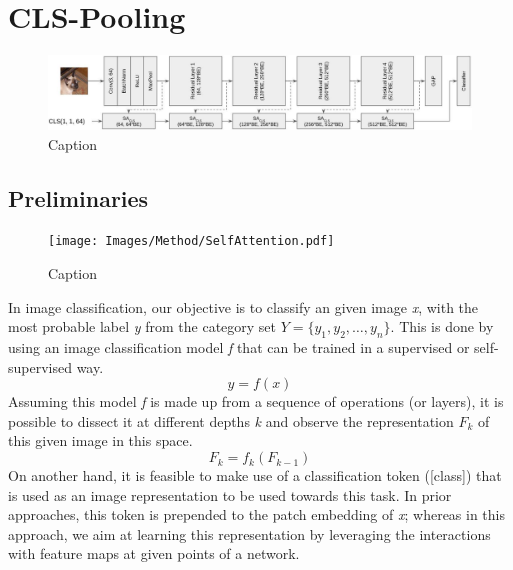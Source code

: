 \section{CLS-Pooling}
\begin{figure}[t]
    \centering
    \includegraphics[scale=0.3]{Images/Method/Stream.pdf}
    \caption{Caption}
    \label{fig:fig_method}
\end{figure}

\subsection{Preliminaries}
\begin{figure}[t]
    \centering
    \texttt{[image: Images/Method/SelfAttention.pdf]}
    \caption{Caption}
    \label{fig:fig_crossatt}
\end{figure}
In image classification, our objective is to classify an given image \textit{x}, with the most probable label \textit{y} from the category set $Y=\{y_1, y_2, \dots, y_n\}$. This is done by using an image classification model \textit{f} that can be trained in a supervised or self-supervised way.
\begin{equation}
    y = f(x)
\end{equation}
Assuming this model \textit{f} is made up from a sequence of operations (or layers), it is possible to dissect it at different depths \textit{k} and observe the representation $F_k$ of this given image in this space.
\begin{equation}
    F_k = f_k(F_{k-1})
\end{equation}
On another hand, it is feasible to make use of a classification token ({[class]}) \cite{DBLP:journals/corr/abs-1810-04805,DBLP:journals/corr/abs-2010-11929} that is used as an image representation to be used towards this task. In prior approaches, this token is prepended to the patch embedding of \textit{x}; whereas  in this approach, we aim at learning this representation by leveraging the interactions with feature maps at given points of a network. %

